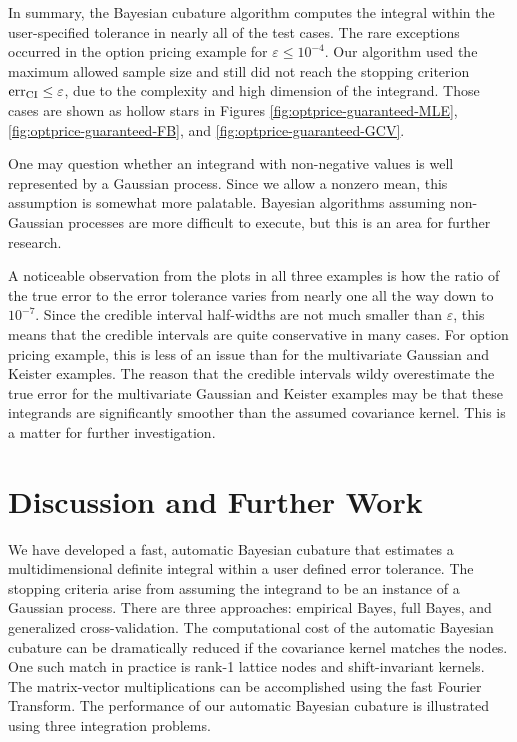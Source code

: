 \documentclass{svjour3}                     %
\newcommand{\err}{\textup{err}}
\begin{document}
In summary, the Bayesian cubature algorithm computes the integral within the user-specified tolerance in nearly all of the test cases.  The rare exceptions occurred in the option pricing example for $\varepsilon \le 10^{-4}$. Our algorithm used the maximum allowed sample size and still did not reach the stopping criterion $\err_{\textup{CI}} \leq \varepsilon$, due to the complexity and high dimension of the integrand. Those cases are shown as hollow stars in Figures \ref{fig:optprice-guaranteed-MLE}, \ref{fig:optprice-guaranteed-FB}, and 
\ref{fig:optprice-guaranteed-GCV}.

One may question whether an integrand with non-negative values is well represented by a Gaussian process.  Since we allow a nonzero mean, this assumption is somewhat more palatable. Bayesian algorithms assuming non-Gaussian processes are more difficult to execute, but this is an area for further research.

A noticeable observation from the plots in all three examples is how the ratio of the true error to the error tolerance varies from nearly one all the way down to $10^{-7}$.  Since the credible interval half-widths are not much smaller than $\varepsilon$, this means that the credible intervals are quite conservative in many cases.  For option pricing example, this is less of an issue than for the multivariate Gaussian and Keister examples. The reason that the credible intervals wildy overestimate the true error for the multivariate Gaussian and Keister examples may be that these integrands are significantly smoother than the assumed covariance kernel.  This is a matter for further investigation.




\section{Discussion and Further Work}

We have developed a fast, automatic Bayesian cubature that estimates a multidimensional definite integral within a user defined error tolerance.  The stopping criteria arise from assuming the integrand to be an instance of a Gaussian process. There are three approaches:  empirical Bayes, full Bayes, and generalized cross-validation.  The computational cost of the automatic Bayesian cubature can be dramatically reduced if the covariance kernel matches the nodes.  One such match in practice is rank-1 lattice nodes and shift-invariant kernels.  The matrix-vector multiplications can be accomplished using the fast Fourier Transform.  The performance of our automatic Bayesian cubature is illustrated using three integration problems.  
\end{document}

